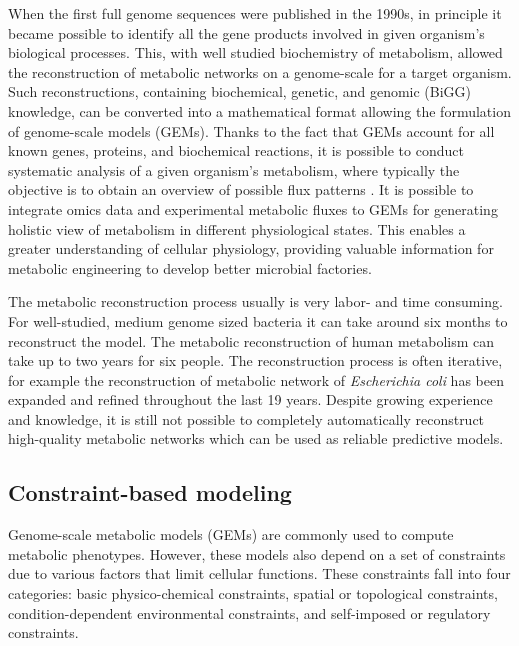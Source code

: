 When the first full genome sequences were published in the 1990s, in principle it became possible to identify all the gene products involved in 
given organism's biological processes. This, with well studied biochemistry of metabolism, allowed the reconstruction of metabolic networks on a genome-scale
for a target organism. Such reconstructions, containing biochemical, genetic, and genomic (BiGG) knowledge, can be converted into a mathematical format 
allowing the formulation of genome-scale models (GEMs). \cite{Palsson2009}
Thanks to the fact that GEMs account for all known genes, proteins, and biochemical reactions, it is possible to  
conduct systematic analysis of a given organism's metabolism, where typically the objective is to obtain an overview of possible flux
patterns \cite{Kerkhoven2014, Chen2023}. %
It is possible to integrate omics data and experimental metabolic fluxes to GEMs for generating holistic 
view of metabolism in different physiological states. This enables a greater understanding of cellular physiology, providing valuable information 
for metabolic engineering to develop better microbial factories.

The metabolic reconstruction process usually is very labor- and time consuming. For well-studied, medium genome sized bacteria it can take around six months to reconstruct the model. 
The metabolic reconstruction of human metabolism can take up to two years for six people. The reconstruction process is often iterative, for example the reconstruction of metabolic 
network of \textit{Escherichia coli} has been expanded and refined throughout the last 19 years. Despite growing experience and 
knowledge, it is still not possible to completely automatically reconstruct high-quality metabolic networks which can be used as reliable predictive models. \cite{Thiele2010} 

\subsection{Constraint-based modeling}

Genome-scale metabolic models (GEMs) are commonly used to compute metabolic phenotypes. However, these models also depend on a set of constraints due to various factors that limit cellular functions. These constraints fall into four categories: basic physico-chemical constraints, spatial or topological constraints, condition-dependent environmental constraints, and self-imposed or regulatory constraints. \cite{Price2004}


